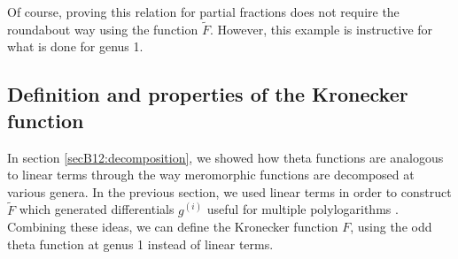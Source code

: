 Of course, proving this relation for partial fractions does not require the roundabout way using the function $\tilde F$. However, this example is instructive for what is done for genus 1.

\subsection{Definition and properties of the Kronecker function}

In section \ref{secB12:decomposition}, we showed how theta functions are analogous to linear terms through the way meromorphic functions are decomposed at various genera. In the previous section, we used linear terms in order to construct $\tilde F$ which generated differentials $g^{(i)}$ useful for multiple polylogarithms \cite{rep:B1}. Combining these ideas, we can define the Kronecker function $F$, using the odd theta function at genus 1 instead of linear terms.

